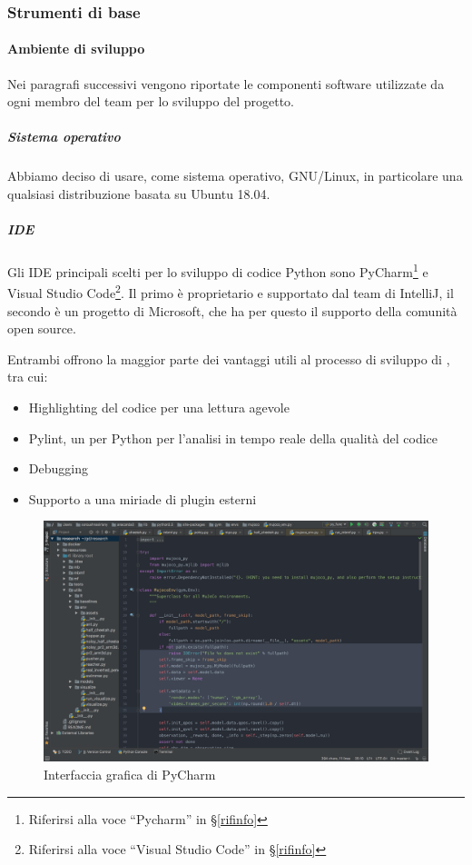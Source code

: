         \subsubsection{Strumenti di base}\label{PP:Sviluppo:Strumenti}

	    \paragraph{Ambiente di sviluppo}\label{PP:Sviluppo:Strumenti:AmbienteSviluppo}
	    Nei paragrafi successivi vengono riportate le componenti software utilizzate da ogni membro del team per lo sviluppo del progetto.


	    \subparagraph{Sistema operativo}\label{PP:Sviluppo:Strumenti:AmbienteSviluppo:SistemaOperativo}
	    Abbiamo deciso di usare, come sistema operativo, GNU/Linux, in particolare una qualsiasi distribuzione basata su Ubuntu 18.04.

	    \subparagraph{IDE}\label{PP:Sviluppo:Strumenti:AmbienteSviluppo:IDE} %
		Gli IDE principali scelti per lo sviluppo di codice Python sono
		{PyCharm}\footnote{Riferirsi alla voce ``Pycharm'' in \S\ref{rifinfo}} e
		{Visual Studio Code}\footnote{Riferirsi alla voce ``Visual Studio Code'' in \S\ref{rifinfo}}.
		Il primo è proprietario e supportato dal team di IntelliJ, il secondo è un progetto  di Microsoft, che ha
		per questo il supporto della comunità open source.\par
		Entrambi offrono la maggior parte dei vantaggi utili al processo di sviluppo di \progetto, tra cui:
		\begin{itemize}
			\item Highlighting del codice per una lettura agevole
			\item Pylint, un  per Python per l'analisi in tempo reale della qualità del codice
			\item Debugging
			\item Supporto a una miriade di plugin esterni
		\end{itemize}

		\begin{figure}[H]
			\includegraphics[width=\textwidth]{img/pycharm.png}
			\caption{Interfaccia grafica di PyCharm}
		\end{figure}
